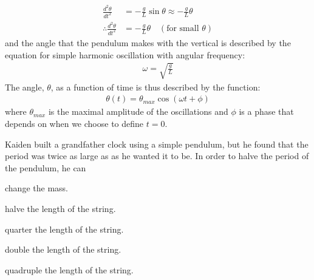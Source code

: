 \begin{align*}
\frac{d^2\theta}{dt^2} &= -\frac{g}{L}\sin\theta \approx -\frac{g}{L}\theta \\
\therefore \frac{d^2\theta}{dt^2} &=-\frac{g}{L}\theta \quad (\text{for small }\theta)
\end{align*}
and the angle that the pendulum makes with the vertical is described by the equation for simple harmonic oscillation with angular frequency:
\begin{align*}
\omega = \sqrt{\frac{g}{L}}
\end{align*}
The angle, $\theta$, as a function of time is thus described by the function:
\begin{align*}
\theta(t) = \theta_{max}\cos(\omega t +\phi)
\end{align*}
where $\theta_{max}$ is the maximal amplitude of the oscillations and $\phi$ is a phase that depends on when we choose to define $t=0$.

\begin{checkpoint}\label{cp:simpleharmonicmotion:pendulum}
\begin{MCquestion}{Kaiden built a grandfather clock using a simple pendulum, but he found that the period was twice as large as as he wanted it to be. In order to halve the period of the pendulum, he can}
\item change the mass.
\item halve the length of the string.
\item quarter the length of the string.\correct
\item double the length of the string.
\item quadruple the length of the string.
\end{MCquestion}
\end{checkpoint}

